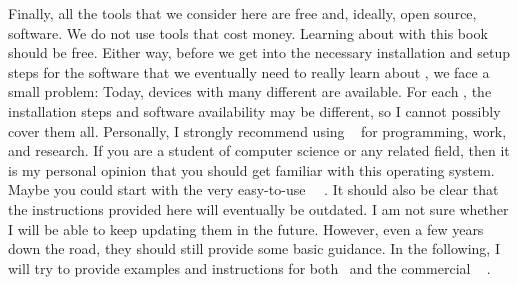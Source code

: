 Finally, all the tools that we consider here are free and, ideally, open source, software.
We do not use tools that cost money.
Learning about  with this book should be free.%
%
%
%
Either way, before we get into the necessary installation and setup steps for the software that we eventually need to really learn about , we face a small problem:
Today, devices with many different  are available.
For each , the installation steps and software availability may be different, so I cannot possibly cover them all.
Personally, I strongly recommend using \linux~\cite{T1999TLE,B2022ELATCL,H2022LML} for programming, work, and research.
If you are a student of computer science or any related field, then it is my personal opinion that you should get familiar with this operating system.
%
%
%
Maybe you could start with the very easy-to-use \ubuntu\ \linux~\cite{CN2020ULB,H2020ULU2E}.
It should also be clear that the instructions provided here will eventually be outdated.
I am not sure whether I will be able to keep updating them in the future.
However, even a few years down the road, they should still provide some basic guidance.
In the following, I will try to provide examples and instructions for both \ubuntu\ and the commercial \microsoftWindows~\cite{B2023W1IO} .%
%
%
%
%
%
%
%
\endhsection%
%
